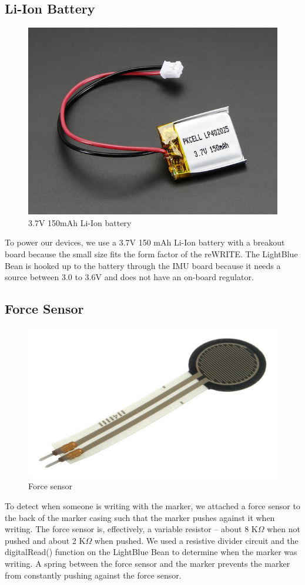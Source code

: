 \documentclass[10pt,journal]{IEEEtran}
\begin{document}
\subsection{Li-Ion Battery}

\begin{figure}[h]
  \centering
    \includegraphics[width=0.6\linewidth]{figures/battery}
  \caption{3.7V 150mAh Li-Ion battery}
  \label{fig:battery}
\end{figure}
  To power our devices, we use a 3.7V 150 mAh Li-Ion battery with a breakout board because the small size fits the form factor of the reWRITE. The LightBlue Bean is hooked up to the battery through the IMU board because it needs a source between 3.0 to 3.6V and does not have an on-board regulator.

\subsection{Force Sensor}

\begin{figure}[H]
  \centering
    \includegraphics[width=0.6\linewidth]{figures/force-sensor}
  \caption{Force sensor}
  \label{fig:system}
\end{figure}
  To detect when someone is writing with the marker, we attached a force sensor to the back of the marker casing such that the marker pushes against it when writing. The force sensor is, effectively, a variable resistor -- about 8 K$\Omega$ when not pushed and about 2 K$\Omega$ when pushed. We used a resistive divider circuit and the digitalRead() function on the LightBlue Bean to determine when the marker was writing. A spring between the force sensor and the marker prevents the marker from constantly pushing against the force sensor.
\end{document}
